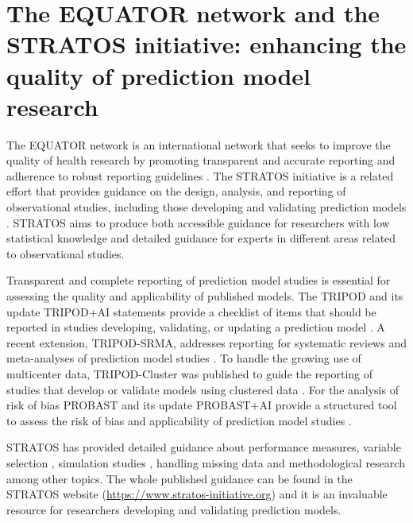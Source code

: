 \section[Enhancing quality of prediction model research]{The EQUATOR network and the STRATOS initiative: enhancing the quality of prediction model research}
 
The \gls{EQUATOR} network is an international network that seeks to improve the quality of health research by promoting transparent and accurate reporting and adherence to robust reporting guidelines \cite{simeraTransparentAccurateReporting2010}. The \gls{STRATOS} initiative is a related effort that provides guidance on the design, analysis, and reporting of observational studies, including those developing and validating prediction models \cite{sauerbreiSTRengtheningAnalyticalThinking2014}. \gls{STRATOS} aims to produce both accessible guidance for researchers with low statistical knowledge and detailed guidance for experts in different areas related to observational studies.

Transparent and complete reporting of prediction model studies is essential for assessing the quality and applicability of published models. The \gls{TRIPOD} and its update \gls{TRIPOD}+AI statements provide a checklist of items that should be reported in studies developing, validating, or updating a prediction model \cite{collinsTransparentReportingMultivariable2015,collinsTRIPODAIStatementUpdated2024}. A recent extension, \gls{TRIPOD}-SRMA, addresses reporting for systematic reviews and meta-analyses of prediction model studies \cite{snellTransparentReportingMultivariable2023}. To handle the growing use of multicenter data, \gls{TRIPOD}-Cluster was published to guide the reporting of studies that develop or validate models using clustered data \cite{debrayTransparentReportingMultivariable2023}. For the analysis of risk of bias \gls{PROBAST} and its update PROBAST+AI provide a structured tool to assess the risk of bias and applicability of prediction model studies \cite{moonsPROBASTToolAssess2019, moonsPROBASTAIUpdatedQuality2025}.

\gls{STRATOS} has provided detailed guidance about performance measures, \cite{vancalsterPerformanceEvaluationPredictive2024} variable selection \cite{heinzeVariableSelectionReview2018},  simulation studies \cite{boulesteixIntroductionStatisticalSimulations2020}, handling missing data \cite{leeFrameworkTreatmentReporting2021} and methodological research \cite{heinzePhasesMethodologicalResearch2024} among other topics. The whole published guidance can be found in the STRATOS website (\url{https://www.stratos-initiative.org}) and it is an invaluable resource for researchers developing and validating prediction models. 

